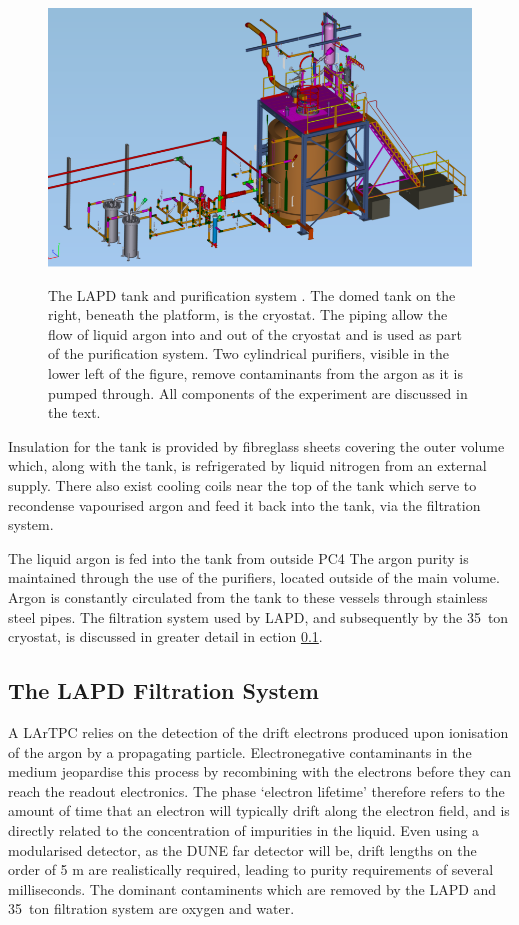 \begin{figure}[ht]
  \centering
  \includegraphics[width=15cm]{LAPDTankPiping.png}
  \label{fig:LAPDTankPiping}
  \caption[LAPD tank and purification system]{The LAPD tank and purification system \cite{LAPD}.  The domed tank on the right, beneath the platform, is the cryostat.  The piping allow the flow of liquid argon into and out of the cryostat and is used as part of the purification system.  Two cylindrical purifiers, visible in the lower left of the figure, remove contaminants from the argon as it is pumped through.  All components of the experiment are discussed in the text.}
\end{figure}

Insulation for the tank is provided by fibreglass sheets covering the outer volume which, along with the tank, is refrigerated by liquid nitrogen from an external supply.  There also exist cooling coils near the top of the tank which serve to recondense vapourised argon and feed it back into the tank, via the filtration system.

The liquid argon is fed into the tank from outside PC4  The argon purity is maintained through the use of the purifiers, located outside of the main volume.  Argon is constantly circulated from the tank to these vessels through stainless steel pipes.  The filtration system used by LAPD, and subsequently by the 35~ton cryostat, is discussed in greater detail in ection \ref{sec:LAPDFiltration}.

\subsection{The LAPD Filtration System}\label{sec:LAPDFiltration}

A LArTPC relies on the detection of the drift electrons produced upon ionisation of the argon by a propagating particle.  Electronegative contaminants in the medium jeopardise this process by recombining with the electrons before they can reach the readout electronics.  The phase `electron lifetime' therefore refers to the amount of time that an electron will typically drift along the electron field, and is directly related to the concentration of impurities in the liquid.  Even using a modularised detector, as the DUNE far detector will be, drift lengths on the order of 5 m are realistically required, leading to purity requirements of several milliseconds.  The dominant contaminents which are removed by the LAPD and 35~ton filtration system are oxygen and water.

